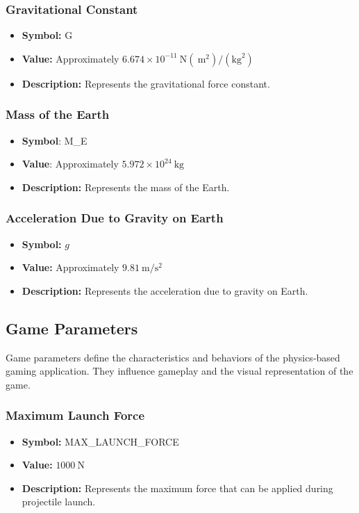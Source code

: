 \documentclass[12pt, titlepage]{article}
\begin{document}
\subsubsection{Gravitational Constant}
\begin{itemize}
  \item \textbf{Symbol:} G
  \item \textbf{Value:} Approximately $6.674 \times 10^{-11} \mathrm{~N}\left(\mathrm{~m}^{2}\right) /\left(\mathrm{kg}^{2} \right)$
  \item \textbf{Description:} Represents the gravitational force constant.
\end{itemize}

\subsubsection{Mass of the Earth}

\begin{itemize}
  \item \textbf{Symbol}: M\_E
  \item \textbf{Value}: Approximately $5.972 \times 10^{24} \mathrm{~kg}$
  \item \textbf{Description:} Represents the mass of the Earth.
\end{itemize}

\subsubsection{Acceleration Due to Gravity on Earth}

\begin{itemize}
  \item \textbf{Symbol:} $g$
  \item \textbf{Value:} Approximately $9.81 \mathrm{~m} / \mathrm{s}^{2} $
  \item \textbf{Description:} Represents the acceleration due to gravity on Earth.
\end{itemize}

\subsection{Game Parameters}
Game parameters define the characteristics and behaviors of the physics-based gaming application. They influence gameplay and the visual representation of the game.

\subsubsection{Maximum Launch Force}
\begin{itemize}
  \item \textbf{Symbol:} MAX\_LAUNCH\_FORCE
  \item \textbf{Value:} $1000 \mathrm{~N}$
  \item \textbf{Description:} Represents the maximum force that can be applied during projectile launch.
\end{itemize}
\end{document}
